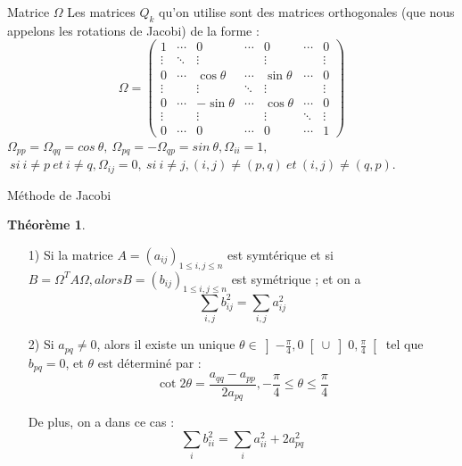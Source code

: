 \documentclass[french, 10pt]{beamer}
\theoremstyle{definition}
\newtheorem{theoreme}{Théorème}
\begin{document}
\begin{frame}{Matrice $\Omega$}
	Les matrices $Q_k$ qu'on utilise sont des matrices orthogonales (que nous appelons les rotations de Jacobi) de la forme :
	\begin{equation}
	\Omega = \left( \begin{array}{ccccccc}
	1 & \cdots & 0 & \cdots & 0 & \cdots & 0 \\
	\vdots & \ddots & \vdots & & \vdots & & \vdots \\
	0 & \cdots & \cos \theta & \cdots & \sin \theta & \cdots & 0 \\
	\vdots & & \vdots & \ddots & \vdots & & \vdots \\
	0 & \cdots & -\sin \theta & \cdots & \cos \theta & \cdots & 0 \\
	\vdots & & \vdots & & \vdots & \ddots & \vdots \\
	0 & \cdots & 0 & \cdots & 0 & \cdots & 1
	\end{array} \right)
	\label{eq:rotation_jacobi}
	\end{equation}
	$\Omega_{pp} = \Omega_{qq} = cos~\theta, ~ \Omega_{pq} = -\Omega_{qp} = sin~ \theta,
	\Omega_{ii}=1, $ \\ $ ~ si ~i \neq p ~et~ i \neq q,
	\Omega_{ij} = 0, ~si~ i\neq j, (i, j) \neq (p, q) ~et~ (i, j) \neq (q, p).$\\
	
\end{frame}
\begin{frame}{Méthode de Jacobi}
	
	
	\begin{theoreme}
		\begin{itemize}
			\item[1)]Si la matrice $A = (a_{ij} )_{1\leq i,j\leq n}$ est symtérique et si $B = \Omega^T A\Omega, alors B = (b_{ij} )_{1\leq i,j\leq n}$
			est symétrique ; et on a
			$$\sum_{i, j} b_{i j}^2=\sum_{i, j} a_{i j}^2$$
			\item[2)]Si $a_{p q} \neq 0$, alors il existe un unique $\theta \in \left] -\frac{\pi}{4}, 0 \right[ \cup \left] 0, \frac{\pi}{4} \right[$ tel que $b_{p q} = 0$, et $\theta$ est déterminé par :
			$$\cot 2 \theta=\frac{a_{q q}-a_{p p}}{2 a_{p q}},-\frac{\pi}{4} \leq \theta \leq \frac{\pi}{4}$$
			
			De plus, on a dans ce cas :$$\sum_i b_{i i}^2=\sum_i a_{i i}^2+2 a_{p q}^2$$
		\end{itemize}
		
		
	\end{theoreme}
\end{frame}
\end{document}
